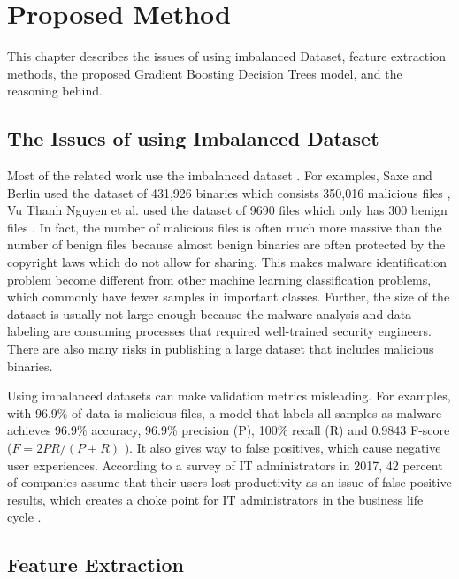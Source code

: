 \chapter{Proposed Method}
\graphicspath{{Chapter4/Figs/}}

\begin{chapabstract}
This chapter describes the issues of using imbalanced Dataset, feature extraction methods, the proposed Gradient Boosting Decision Trees model, and the reasoning behind.
\end{chapabstract}

\section{The Issues of using Imbalanced Dataset}

Most of the related work use the imbalanced dataset \cite{saxe2015deep,vu2017metamorphic}. 
For examples, Saxe and Berlin used the dataset of 431,926 binaries which consists 350,016 malicious files \cite{saxe2015deep}, Vu Thanh Nguyen et al. used the dataset of 9690 files which only has 300 benign files \cite{vu2017metamorphic}. 
In fact, the number of malicious files is often much more massive than the number of benign files because almost benign binaries are often protected by the copyright laws which do not allow for sharing. 
This makes malware identification problem become different from other machine learning classification problems, which commonly have fewer samples in important classes. 
Further, the size of the dataset is usually not large enough because the malware analysis and data labeling are consuming processes that required well-trained security engineers. 
There are also many risks in publishing a large dataset that includes malicious binaries. 

Using imbalanced datasets can make validation metrics misleading.
For examples, with 96.9\% of data is malicious files, a model that labels all samples as malware achieves 96.9\% accuracy, 96.9\% precision (P), 100\% recall (R) and 0.9843 F-score ($F =  2PR / (P + R) $ \cite{chinchor1992muc}).
It also gives way to false positives, which cause negative user experiences.
According to a survey of IT administrators in 2017, 42 percent of companies assume that their users lost productivity as an issue of false-positive results, which creates a choke point for IT administrators in the business life cycle \cite{jonathan2017survey}.


\section{Feature Extraction}
\label{sec:feature-extraction}

